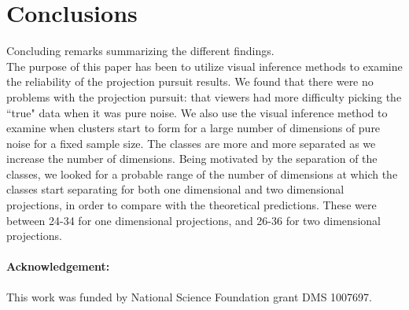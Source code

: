 \documentclass[12]{article}
\begin{document}
%
% 
%
%

\section{Conclusions}
{\color{red} Concluding remarks summarizing the different findings.} \\
The purpose of this paper has been to utilize  visual inference methods to examine the reliability of the projection pursuit results. We found that there were no problems with the projection pursuit: that viewers had more difficulty picking the ``true" data when it was pure noise. We also use the visual inference method to examine when clusters start to form for a large number of dimensions of pure noise for a fixed sample size. The classes are more and more separated as we increase the number of dimensions. Being motivated by the separation of the classes, we looked for a probable range of the number of dimensions at which the classes start separating for both one dimensional and two dimensional projections, in order to compare with the theoretical predictions. These were between 24-34 for one dimensional projections, and 26-36 for two dimensional projections.

\paragraph{Acknowledgement:}
%
This work was funded by National Science Foundation grant DMS 1007697.



\end{document}
